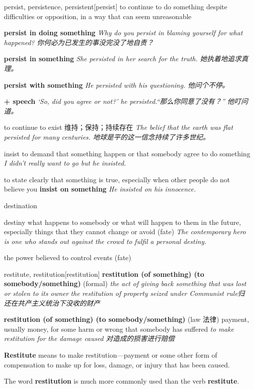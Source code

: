 \begin{DefWord}{persist, persistence, persistent}[persist]
    to continue to do something despite difficulties or opposition, in a way that can seem unreasonable

    \textbf{persist in doing something} \textit{Why do you persist in blaming yourself for what happened? 你何必为已发生的事没完没了地自责？}

    \textbf{persist in something} \textit{She persisted in her search for the truth. 她执着地追求真理。}

    \textbf{persist with something} \textit{He persisted with his questioning. 他问个不停。}

    \textbf{+ speech} \textit{‘So, did you agree or not?’ he persisted.“那么你同意了没有？” 他叮问道。}

    to continue to exist 维持；保持；持续存在
    \textit{The belief that the earth was flat persisted for many centuries. 地球是平的这一信念持续了许多世纪。}
\end{DefWord}

\begin{DefWord}{insist}
    to demand that something happen or that somebody agree to do something
    \textit{I didn't really want to go but he insisted.}

    to state clearly that something is true, especially when other people do not believe you
    \textbf{insist on something} \textit{He insisted on his innocence.}
\end{DefWord}

\begin{DefWord}{destination}
\end{DefWord}

\begin{DefWord}{destiny}
    what happens to somebody or what will happen to them in the future, especially things that they cannot change or avoid (fate)
    \textit{The contemporary hero is one who stands out against the crowd to fulfil a personal destiny.}

    the power believed to control events (fate)
\end{DefWord}

\begin{DefWord}{restitute, restitution}[restitution]
    \textbf{restitution (of something) (to somebody/something)} (formal) \textit{the act of giving back something that was lost or stolen to its owner}
    \textit{the restitution of property seized under Communist rule归还在共产主义统治下没收的财产}

    \textbf{restitution (of something) (to somebody/something)} (law 法律) payment, usually money, for some harm or wrong that somebody has suffered
    \textit{to make restitution for the damage caused 对造成的损害进行赔偿}

    \textbf{Restitute} means to make restitution—payment or some other form of compensation to make up for loss, damage, or injury that has been caused.

    The word \textbf{restitution} is much more commonly used than the verb \textbf{restitute}.
\end{DefWord}

